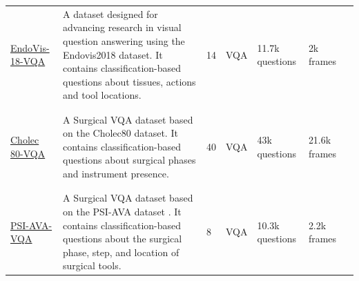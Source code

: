 \begin{longtable}{|p{1.29cm}|p{3.00cm}|p{0.70cm}|p{2.00cm}|p{1.80cm}|p{2.30cm}|p{1.60cm}|}
  \hline
  \multicolumn{1}{|l|}{\parbox{1.20cm}{\raggedright\hspace{0pt}  \href{https://github.com/lalithjets/SurgicalGPT}{EndoVis-18-VQA}
  }} 
  & \multicolumn{1}{l|}{\parbox{2.90cm}{\raggedright\hspace{0pt}A dataset designed for advancing research in visual question answering using the Endovis2018 dataset. It contains classification-based questions about tissues, actions and tool locations. } }
  & \multicolumn{1}{l|}{\parbox{0.60cm}{\raggedright\hspace{0pt}14} }
  & VQA
  & 11.7k questions
  & 2k frames  
  & \multicolumn{1}{l|}{\parbox{1.50cm}{\raggedright\hspace{0pt}\citep{seenivasan2022surgical}} }  \\
  & &  
  & 
  & 
  & 
  &
  \\ 
  & &  
  & 
  &
  &
  &
  \\
  \hline 
  \multicolumn{1}{|l|}{\parbox{1.20cm}{\raggedright\hspace{0pt}  \href{https://github.com/lalithjets/SurgicalGPT}{Cholec}\\\href{https://github.com/lalithjets/SurgicalGPT}{80-VQA}
  }} 
  & \multicolumn{1}{l|}{\parbox{2.90cm}{\raggedright\hspace{0pt}A Surgical VQA dataset based on the Cholec80 dataset. It contains classification-based questions about surgical phases and instrument presence. } }
  & \multicolumn{1}{l|}{\parbox{0.60cm}{\raggedright\hspace{0pt}40} }
  & VQA
  & 43k questions
  & 21.6k frames  
  & \multicolumn{1}{l|}{\parbox{1.50cm}{\raggedright\hspace{0pt}\citep{seenivasan2022surgical}} }  \\
  & &  
  & 
  & 
  & 
  &
  \\ 
  & &  
  & 
  &
  &
  &
  \\
  \hline  
  \multicolumn{1}{|l|}{\parbox{1.20cm}{\raggedright\hspace{0pt}  \href{https://github.com/lalithjets/SurgicalGPT}{PSI-AVA-VQA}
  }} 
  & \multicolumn{1}{l|}{\parbox{2.90cm}{\raggedright\hspace{0pt}A Surgical VQA dataset based on the PSI-AVA dataset . It contains classification-based questions about the surgical phase, step, and location of surgical tools. } }
  & \multicolumn{1}{l|}{\parbox{0.60cm}{\raggedright\hspace{0pt}8} }
  & VQA
  & 10.3k questions
  & 2.2k frames
  & \multicolumn{1}{l|}{\parbox{1.50cm}{\raggedright\hspace{0pt}\citep{seenivasan2023surgicalgpt}} }  \\

\end{longtable}
